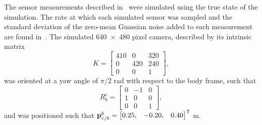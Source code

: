 The sensor measurements described in~ were
simulated using the true state of the simulation. The rate at which each
simulated sensor was sampled and the standard deviation of the zero-mean
Guassian noise added to each measurement are found
in~.
The 
simulated 640~$\times$~480 pixel camera, described by its intrinsic matrix
\begin{equation}
  K =
  \begin{bmatrix}
    410 & 0 & 320 \\
    0 & 420 & 240 \\
    0& 0 & 1
  \end{bmatrix},
\end{equation}
was oriented at a yaw angle of $\pi/2$ rad with respect to the body
frame, such that
\begin{equation}
  R_b^c =
  \begin{bmatrix}
    0 & -1 & 0 \\
    1 & 0 & 0 \\
    0 & 0 & 1
  \end{bmatrix},
\end{equation}
and was positioned such that $\boldsymbol{\mathrm{p}}_{c/b}^b = \begin{bmatrix}0.25, & -0.20, &
0.40 \end{bmatrix}^{\mathsf{T}}$ m.

